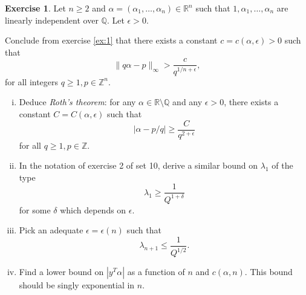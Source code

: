 \documentclass[12pt,a4paper]{article}
\theoremstyle{plain}
\newtheorem*{Sol*}{Solution}
\theoremstyle{definition}
\newtheorem{Ex}{Exercise}
\def \Q {\mathbb Q}
\def \R {\mathbb R}
\def \Z {\mathbb Z}
\newif\ifsolutions
\newcommand{\exercise}[2]{
			\begin{Ex} #1 \end{Ex}
			\ifsolutions  \begin{Sol*} #2 \end{Sol*} \bigskip \else \bigskip  \fi
		}
\begin{document}
\exercise{

	Let $n\geq2$ and $\alpha = (\alpha_1, \dots, \alpha_n) \in \R^n$ such that $1, \alpha_1, \dots, \alpha_n$ are linearly independent over $\Q$. 
	Let $\epsilon>0$.

	Conclude from exercise \ref{ex:1} that there exists a constant $c=c(\alpha, \epsilon) > 0$ such that
		\[ \| q \alpha - p \|_\infty > \frac{c}{q^{1/n + \epsilon}}, \]
	for all integers $q \geq 1, p \in \Z^n$.

	\begin{enumerate}[i)]
		\item Deduce \emph{Roth's theorem}: for any $\alpha \in \R\setminus\Q$ and any $\epsilon>0$, there exists a constant $C=C(\alpha, \epsilon)$ such that
			\[ | \alpha - p/q | \geq \frac{C}{q^{2+\epsilon}} \]
		for all $q\geq1, p\in\Z$.
		
		\item In the notation of exercise 2 of set 10, derive a similar bound on $\lambda_1$ of the type
			\[ \lambda_1 \geq \frac{1}{Q^{1+\delta}} \]
		for some $\delta$ which depends on $\epsilon$.

		\item Pick an adequate $\epsilon = \epsilon(n)$ such that 
			\[ \lambda_{n+1} \leq \frac{1}{Q^{1/2}}. \]
		
		\item Find a lower bound on $|y^T \alpha|$ as a function of $n$ and $c(\alpha, n)$.
			This bound should be singly exponential in $n$.

	\end{enumerate}
}
{}
\end{document}
